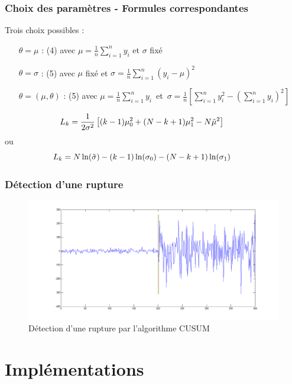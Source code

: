 \documentclass{beamer}
\begin{document}
\begin{frame}
	\frametitle{Choix des paramètres - Formules correspondantes}
	Trois choix possibles :
	\vspace*{.3cm}
	\begin{itemize}
		\item[$\theta=\mu$]: (4) avec $\mu=\frac1n\sum_{i=1}^ny_i$ et $\sigma$ fixé
		\vspace*{.2cm}
		\item[$\theta=\sigma$]:  (5) avec $\mu$ fixé et $\sigma=\frac1n\sum_{i=1}^n(y_i-\mu)^2$
		\vspace*{.2cm}
		\item[$\theta=(\mu,\theta)$]: (5) avec \mbox{$\mu=\frac1n\sum_{i=1}^ny_i$ et $\sigma=\frac1n\left[\sum_{i=1}^ny_i^2-(\sum_{i=1}^ny_i)^2\right]$}
	\end{itemize}
	\vspace*{0.8cm}
	\begin{equation}
	\hspace{-1cm}	L_k=\frac 1{2\sigma^2}\left[(k-1)\mu_0^2+(N-k+1)\mu_1^2-N\tilde\mu^2\right]
	\end{equation}
	ou
	\begin{equation}
	\hspace{-1cm}	L_k=N\ln(\tilde\sigma)-(k-1)\ln(\sigma_0)-(N-k+1)\ln(\sigma_1)
	\end{equation}
\end{frame}

\begin{frame}
	\frametitle{Détection d'une rupture}
	\begin{figure}
		\includegraphics[scale=0.3]{cusum_1rupt.png}
		\caption{Détection d'une rupture par l'algorithme CUSUM}
	\end{figure}
\end{frame}

\section{Implémentations}
\end{document}
